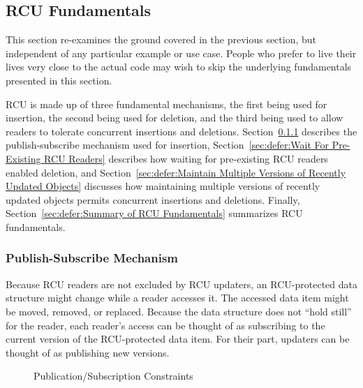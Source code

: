 
\subsection{RCU Fundamentals}
\label{sec:defer:RCU Fundamentals}

This section re-examines the ground covered in the previous section, but
independent of any particular example or use case.
People who prefer to live their lives very close to the actual code may
wish to skip the underlying fundamentals presented in this section.

RCU is made up of three fundamental mechanisms, the first being
used for insertion, the second being used for deletion, and the third
being used to allow readers to tolerate concurrent insertions and deletions.
Section~\ref{sec:defer:Publish-Subscribe Mechanism}
describes the publish-subscribe mechanism used for insertion,
Section~\ref{sec:defer:Wait For Pre-Existing RCU Readers}
describes how waiting for pre-existing RCU readers enabled deletion,
and
Section~\ref{sec:defer:Maintain Multiple Versions of Recently Updated Objects}
discusses how maintaining multiple versions of recently updated objects
permits concurrent insertions and deletions.
Finally,
Section~\ref{sec:defer:Summary of RCU Fundamentals}
summarizes RCU fundamentals.

\subsubsection{Publish-Subscribe Mechanism}
\label{sec:defer:Publish-Subscribe Mechanism}

Because RCU readers are not excluded by RCU updaters, an RCU-protected
data structure might change while a reader accesses it.
The accessed data item might be moved, removed, or replaced.
Because the data structure does not ``hold still'' for the reader,
each reader's access can be thought of as subscribing to the current
version of the RCU-protected data item.
For their part, updaters can be thought of as publishing new versions.


\begin{figure}[tbp]
\centering
{}
\caption{Publication/Subscription Constraints}
\label{fig:defer:Publication/Subscription Constraints}
\end{figure}

